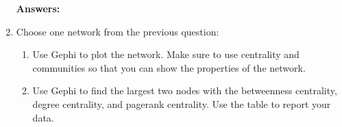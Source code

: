 \documentclass{amsart}
\theoremstyle{definition}
\theoremstyle{remark}
\numberwithin{equation}{section}
\begin{document}
\begin{enumerate}
\vspace{0.2cm}

\textbf{Answers:}








\vspace{5cm}
\clearpage

\item Choose one network  from the previous question: \vspace{0.2cm}
\begin{enumerate}
\item Use Gephi to plot the network. Make sure to use centrality and communities so that you can show the properties of the network.
\item Use Gephi to find the largest two nodes with the betweenness centrality, degree centrality, and pagerank centrality. Use the table to report  your data.
\end{enumerate}


\end{enumerate}
\end{document}
